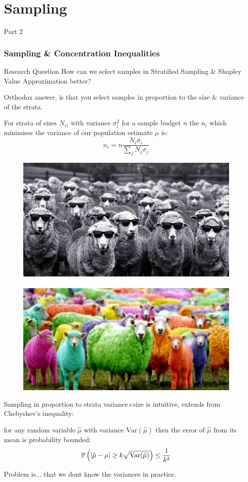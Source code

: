 

\section{Sampling}


\begin{frame}
\Huge{\centerline{Part 2}}
\end{frame}

\begin{frame}
\frametitle{Sampling \& Concentration Inequalities}

\begin{block}{Research Question}
How can we select samples in Stratified Sampling \& Shapley Value Approximation better?
\end{block}

Orthodox answer, is that you select samples in proportion to the size \& variance of the strata.
\begin{theorem}\label{thm:neyman_selection}
For strata of sizes $N_i$, with variance $\sigma_i^2$ for a sample budget $n$ the $n_i$ which minimises the variance of our population estimate $\mu$ is:
$$n_i = n\frac{N_i\sigma_i}{\sum_jN_j\sigma_j}$$
\end{theorem}
\end{frame}


\begin{frame}
\begin{figure}
\includegraphics[width=0.45\linewidth,height=0.25\linewidth]{figs/sheep.png}%
$~~~~~$
\includegraphics[width=0.45\linewidth,height=0.25\linewidth]{figs/sheep2.jpg}%
\end{figure}
Sampling in proportion to strata variance$\times$size is intuitive, extends from Chebyshev's inequality:
\begin{theorem}\label{thm:chebyshevs}
for any random variable $\hat{\mu}$ with variance $\text{Var}(\hat{\mu})$ then the error of $\hat{\mu}$ from its mean is probability bounded:
$$ \operatorname{\mathbb{P}}\left(|\hat{\mu}-\mu|\ge k\sqrt{\text{Var}(\hat{\mu})}\right)\le\frac{1}{k^2} $$
\end{theorem}
Problem is... that we dont know the variances in practice.
\end{frame}


